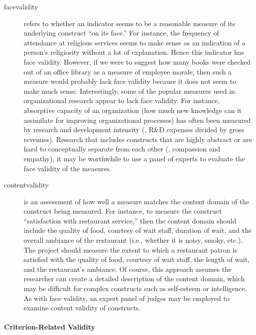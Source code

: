 \begin{description}
	\item[\Gls{facevalidity}] refers to whether an indicator seems to be a reasonable measure of its underlying construct ``on its face.'' For instance, the frequency of attendance at religious services seems to make sense as an indication of a person's religiosity without a lot of explanation. Hence this indicator has face validity. However, if we were to suggest how many books were checked out of an office library as a measure of employee morale, then such a measure would probably lack face validity because it does not seem to make much sense. Interestingly, some of the popular measures used in organizational research appear to lack face validity. For instance, absorptive capacity of an organization (how much new knowledge can it assimilate for improving organizational processes) has often been measured by research and development intensity (\ie, R\&D expenses divided by gross revenues). Research that includes constructs that are highly abstract or are hard to conceptually separate from each other (\eg, compassion and empathy), it may be worthwhile to use a panel of experts to evaluate the face validity of the measures.

	\item[\Gls{contentvalidity}] is an assessment of how well a measure matches the content domain of the construct being measured. For instance, to measure the construct ``satisfaction with restaurant service,'' then the content domain should include the quality of food, courtesy of wait staff, duration of wait, and the overall ambiance of the restaurant (i.e., whether it is noisy, smoky, etc.). The project should measure the extent to which a restaurant patron is satisfied with the quality of food, courtesy of wait staff, the length of wait, and the restaurant's ambiance. Of course, this approach assumes the researcher can create a detailed description of the content domain, which may be difficult for complex constructs such as self-esteem or intelligence. As with face validity, an expert panel of judges may be employed to examine content validity of constructs.
\end{description}

\paragraph{Criterion-Related Validity}


